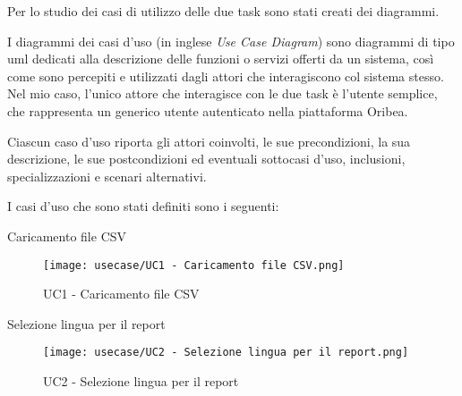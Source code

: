 Per lo studio dei casi di utilizzo delle due task sono stati creati dei diagrammi.

I diagrammi dei casi d'uso (in inglese \emph{Use Case Diagram}) sono diagrammi di tipo \gls{uml} dedicati alla descrizione delle funzioni o servizi offerti da un sistema, così come sono percepiti e utilizzati dagli attori che interagiscono col sistema stesso. Nel mio caso, l'unico attore che interagisce con le due task è l'utente semplice, che rappresenta un generico utente autenticato nella piattaforma Oribea.

Ciascun caso d’uso riporta gli attori coinvolti, le sue precondizioni, la sua descrizione, le sue postcondizioni ed eventuali sottocasi d’uso, inclusioni, specializzazioni e
scenari alternativi.

I casi d’uso che sono stati definiti sono i seguenti:


\hypertarget{UC1}{}
\begin{usecase}{1}{Caricamento file CSV}

\begin{figure}[!h] 
    \centering 
    \texttt{[image: usecase/UC1 - Caricamento file CSV.png]}
    \caption{UC1 - Caricamento file CSV}
\end{figure}

\label{uc:caricamento-file-csv}
\end{usecase}


\hypertarget{UC2}{}
\begin{usecase}{2}{Selezione lingua per il report}

\begin{figure}[!h] 
    \centering 
    \texttt{[image: usecase/UC2 - Selezione lingua per il report.png]}
    \caption{UC2 - Selezione lingua per il report}
\end{figure}

\label{uc:selezione-lingua-report}
\end{usecase}


